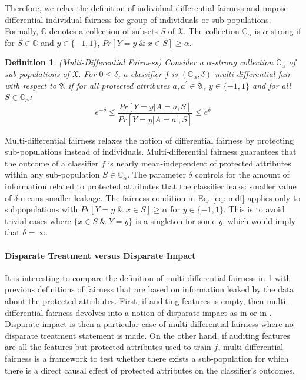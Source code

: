 \documentclass{article}
\newtheorem{defn}{Definition}[section]
\begin{document}
\bigskip
Therefore, we relax the definition of individual differential fairness and impose differential individual fairness for group of individuals or sub-populations. Formally, $\mathbb{C}$ denotes a collection of subsets $S$ of $\mathfrak{X}$. The collection $\mathbb{C}_{\alpha}$ is $\alpha$-strong if for $S\in \mathbb{C}$ and $y\in \{-1, 1\}$, $Pr[Y=y \;\&\; x\in S] \geq \alpha$.  

\begin{defn}(Multi-Differential Fairness)
\label{def: mdf}
Consider a $\alpha$-strong collection $\mathbb{C}_{\alpha}$ of sub-populations of $\mathfrak{X}$. For $0\leq \delta$, a classifier $f$ is $(\mathbb{C}_{\alpha}, \delta)$-multi differential fair with respect to $\mathfrak{A}$ if for all protected attributes $a, a^{'}\in \mathfrak{A}$, $y\in\{-1, 1\}$ and for all $S\in \mathbb{C}_{\alpha}$:
\begin{equation}
\label{eq: mdf}
e^{-\delta} \leq \frac{Pr[Y=y|A=a, S]}{Pr[Y=y|A=a^{'}, S]} \leq e^{\delta} 
\end{equation}
\end{defn}

Multi-differential fairness relaxes the notion of differential fairness by protecting sub-populations instead of individuals. Multi-differential fairness guarantees that the outcome of a classifier $f$ is nearly mean-independent of protected attributes within any sub-population $S\in \mathbb{C}_{\alpha}$. The parameter $\delta$ controls for the amount of information related to protected attributes that the classifier leaks: smaller value of $\delta$ means smaller leakage. The fairness condition in Eq. \ref{eq: mdf} applies only to subpopulations with $Pr[Y=y \;\&\; x\in S] \geq \alpha$ for $y\in\{-1, 1\}$. This is to avoid trivial cases where $\{x\in S \; \& \; Y=y\}$ is a singleton for some $y$, which would imply that $\delta=\infty$. 

\paragraph{Disparate Treatment versus Disparate Impact}
It is interesting to compare the definition of multi-differential fairness in \ref{def: mdf} with previous definitions of fairness that are based on information leaked by the data about the protected attributes.  First, if auditing features is empty, then multi-differential fairness devolves into a notion of disparate impact as in \cite{feldman2015certifying} or in \cite{chouldechova2017fair}. Disparate impact is then a particular case of multi-differential fairness where no disparate treatment  statement is made. On the other hand, if auditing features are all the features but protected attributes used to train $f$, multi-differential fairness is a framework to test whether there exists a sub-population for which there is a direct causal effect of protected attributes on the classifier's outcomes. 
\end{document}
